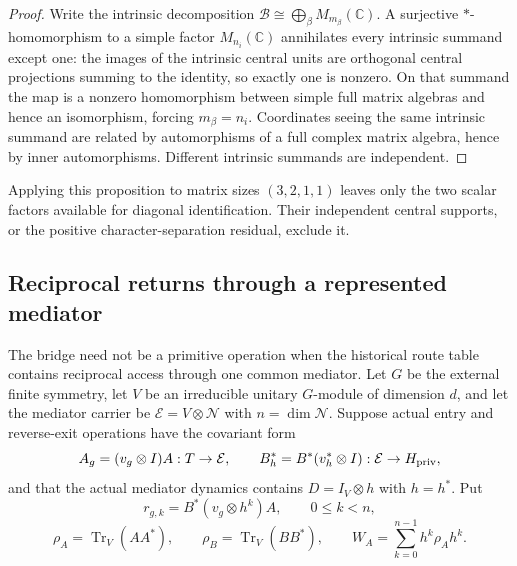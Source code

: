 \documentclass[11pt]{article}
\numberwithin{equation}{section}
\theoremstyle{definition}
\theoremstyle{remark}
\newcommand{\C}{\mathbb C}
\newcommand{\Tr}{\operatorname{Tr}}
\begin{document}
\begin{proof}
Write the intrinsic decomposition
$\mathcal B\cong\bigoplus_\beta M_{m_\beta}(\C)$.  A surjective
$*$-homomorphism to a simple factor $M_{n_i}(\C)$ annihilates every intrinsic
summand except one: the images of the intrinsic central units are orthogonal
central projections summing to the identity, so exactly one is nonzero.  On
that summand the map is a nonzero homomorphism between simple full matrix
algebras and hence an isomorphism, forcing $m_\beta=n_i$.  Coordinates seeing
the same intrinsic summand are related by automorphisms of a full complex
matrix algebra, hence by inner automorphisms.  Different intrinsic summands
are independent.
\end{proof}

Applying this proposition to matrix sizes $(3,2,1,1)$ leaves only the two
scalar factors available for diagonal identification.  Their independent
central supports, or the positive character-separation residual, exclude it.


\subsection{Reciprocal returns through a represented mediator}
\label{app:reciprocal-return}

The bridge need not be a primitive operation when the historical route table
contains reciprocal access through one common mediator.  Let $G$ be the
external finite symmetry, let $V$ be an irreducible unitary $G$-module of
dimension $d$, and let the mediator carrier be
$\mathcal E=V\otimes\mathcal N$ with $n=\dim\mathcal N$.  Suppose actual entry
and reverse-exit operations have the covariant form
\[
 A_g=(v_g\otimes I)A:T\to\mathcal E,
 \qquad
 B_h^*=B^*(v_h^*\otimes I):\mathcal E\to H_{\rm priv},
\]
and that the actual mediator dynamics contains
$D=I_V\otimes h$ with $h=h^*$.  Put
\[
 r_{g,k}=B^*(v_g\otimes h^k)A,
 \qquad 0\le k<n,
\]
\[
 \rho_A=\Tr_V(AA^*),\qquad
 \rho_B=\Tr_V(BB^*),\qquad
 W_A=\sum_{k=0}^{n-1}h^k\rho_Ah^k.
\]
\end{document}
